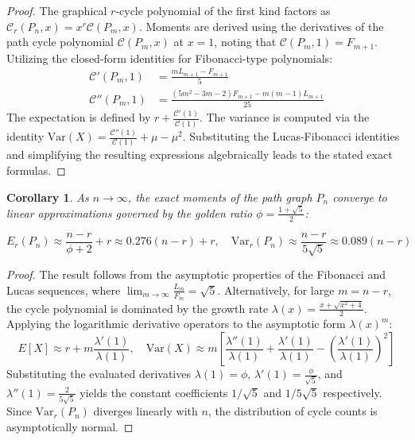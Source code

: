 \documentclass{amsart}
\newtheorem{corollary}[theorem]{Corollary}
\theoremstyle{definition}
\begin{document}
\begin{proof}
The graphical $r$-cycle polynomial of the first kind factors as $\mathcal{C}_r(P_n, x) = x^r \mathcal{C}(P_m, x)$. Moments are derived using the derivatives of the path cycle polynomial $\mathcal{C}(P_m, x)$ at $x=1$, noting that $\mathcal{C}(P_m, 1) = F_{m+1}$. Utilizing the closed-form identities for Fibonacci-type polynomials:
\begin{align*}
    \mathcal{C}'(P_m, 1) &= \frac{m L_{m+1} - F_{m+1}}{5} \\
    \mathcal{C}''(P_m, 1) &= \frac{(5m^2-3m-2)F_{m+1} - m(m-1)L_{m+1}}{25}
\end{align*}
The expectation is defined by $r + \frac{\mathcal{C}'(1)}{\mathcal{C}(1)}$. The variance is computed via the identity $\text{Var}(X) = \frac{\mathcal{C}''(1)}{\mathcal{C}(1)} + \mu - \mu^2$. Substituting the Lucas-Fibonacci identities and simplifying the resulting expressions algebraically leads to the stated exact formulas.
\end{proof}



\begin{corollary}
As $n \to \infty$, the exact moments of the path graph $P_n$ converge to linear approximations governed by the golden ratio $\phi = \frac{1+\sqrt{5}}{2}$:

    \begin{equation*}
        E_r(P_n) \approx \frac{n-r}{\phi + 2} + r \approx 0.276(n-r) + r, \quad\text{Var}_r(P_n) \approx \frac{n-r}{5\sqrt{5}} \approx 0.089(n-r)
    \end{equation*}
\end{corollary}

\begin{proof}
The result follows from the asymptotic properties of the Fibonacci and Lucas sequences, where $\lim_{m \to \infty} \frac{L_m}{F_m} = \sqrt{5}$. Alternatively, for large $m = n-r$, the cycle polynomial is dominated by the growth rate $\lambda(x) = \frac{x + \sqrt{x^2+4}}{2}$. 
Applying the logarithmic derivative operators to the asymptotic form $\lambda(x)^m$:
\begin{equation*}
    E[X] \approx r + m \frac{\lambda'(1)}{\lambda(1)}, \quad \text{Var}(X) \approx m \left[ \frac{\lambda''(1)}{\lambda(1)} + \frac{\lambda'(1)}{\lambda(1)} - \left(\frac{\lambda'(1)}{\lambda(1)}\right)^2 \right]
\end{equation*}
Substituting the evaluated derivatives $\lambda(1) = \phi$, $\lambda'(1) = \frac{\phi}{\sqrt{5}}$, and $\lambda''(1) = \frac{2}{5\sqrt{5}}$ yields the constant coefficients $1/\sqrt{5}$ and $1/5\sqrt{5}$ respectively. Since $\text{Var}_r(P_n)$ diverges linearly with $n$, the distribution of cycle counts is asymptotically normal.
\end{proof}
\end{document}
